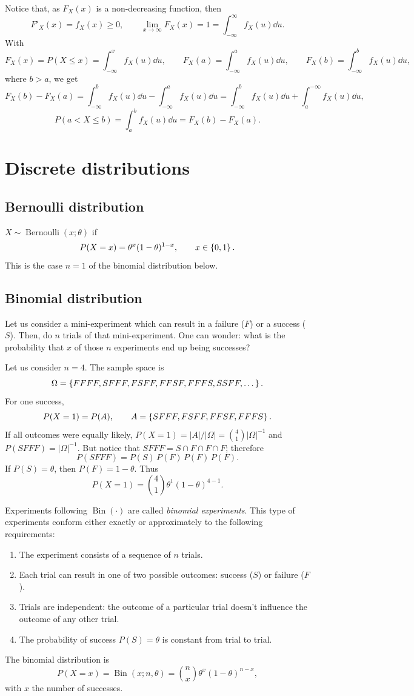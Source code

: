 Notice that, as $F_X(x)$ is a non-decreasing function, then
\[
F'_X(x) = f_X(x) \ge 0, \qquad \lim_{x \to \infty} F_X(x) = 1 = \int_{-\infty}^{\infty} f_X(u)\dd u.
\]
With
\[
F_X(x) = P(X \le x) = \int_{-\infty}^{x} f_X(u)\dd u, \qquad
F_X(a) = \int_{-\infty}^{a} f_X(u)\dd u, \qquad
F_X(b) = \int_{-\infty}^{b} f_X(u)\dd u,
\]
where $b > a$, we get
\[
F_X(b) - F_X(a) = \int_{-\infty}^{b} f_X(u)\dd u - \int_{-\infty}^{a} f_X(u)\dd u
= \int_{-\infty}^{b} f_X(u)\dd u + \int_{a}^{-\infty} f_X(u)\dd u,
\]
\[
P(a < X \le b) = \int_{a}^{b} f_X(u)\dd u = F_X(b) - F_X(a).
\]

\section{Discrete distributions}

\subsection{Bernoulli distribution}
$X \sim \operatorname{Bernoulli}(x;\theta)$ if
\[
P(X = x) = \theta^{x}(1-\theta)^{1-x}, \qquad x \in \left\{0,1\right\}.
\]
This is the case $n = 1$ of the binomial distribution below.

\subsection{Binomial distribution}
Let us consider a mini-experiment which can result in a failure ($F$) or a success ($S$). Then, do $n$ trials of that mini-experiment. One can wonder: what is the probability that $x$ of those $n$ experiments end up being successes?

Let us consider $n = 4$. The sample space is
\[
\Omega = \left\{FFFF, SFFF, FSFF, FFSF, FFFS, SSFF, \dots\right\}.
\]
For one success,
\[
P(X = 1) = P(A), \qquad A = \left\{SFFF, FSFF, FFSF, FFFS\right\}.
\]
If all outcomes were equally likely, $P(X=1) = |A|/|\Omega| = \binom{4}{1}|\Omega|^{-1}$ and $P(SFFF) = |\Omega|^{-1}$. But notice that $SFFF = S \cap F \cap F \cap F$; therefore
\[
P(SFFF) = P(S)\,P(F)\,P(F)\,P(F).
\]
If $P(S) = \theta$, then $P(F) = 1 - \theta$. Thus
\[
P(X = 1) = \binom{4}{1}\theta^{1}(1-\theta)^{4-1}.
\]

Experiments following $\operatorname{Bin}(\cdot)$ are called \emph{binomial experiments}. This type of experiments conform either exactly or approximately to the following requirements:
\begin{enumerate}
\item The experiment consists of a sequence of $n$ trials.
\item Each trial can result in one of two possible outcomes: success ($S$) or failure ($F$).
\item Trials are independent: the outcome of a particular trial doesn't influence the outcome of any other trial.
\item The probability of success $P(S) = \theta$ is constant from trial to trial.
\end{enumerate}
The binomial distribution is
\[
P(X = x) = \operatorname{Bin}(x; n, \theta) = \binom{n}{x}\theta^{x}(1-\theta)^{n-x},
\]
with $x$ the number of successes.

